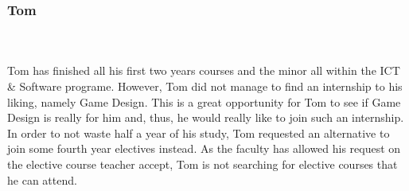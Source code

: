 \subsubsection{Tom}\\\\
Tom has finished all his first two years courses and the minor all within the ICT \& Software programe. However, Tom did not manage to find an internship to his liking, namely Game Design. This is a great opportunity for Tom to see if Game Design is really for him and, thus, he  would really like to join such an internship. In order to not waste half a year of his study, Tom requested an alternative to join some fourth year electives instead. As the faculty has allowed his request on the elective course teacher accept, Tom is not searching for elective courses that he can attend.


